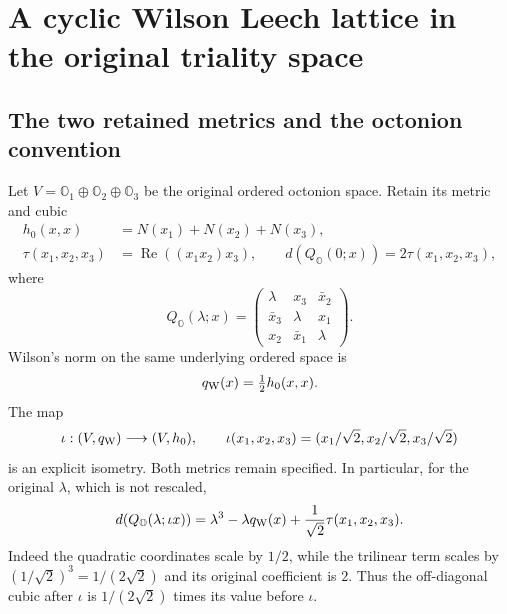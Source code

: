 \section{A cyclic Wilson Leech lattice in the original triality space}
\label{wcl:sec:construction}

\subsection{The two retained metrics and the octonion convention}

Let $V=\mathbb O_1\oplus\mathbb O_2\oplus\mathbb O_3$ be the original
ordered octonion space. Retain its metric and cubic
\[
\begin{aligned}
 h_0(x,x)&=N(x_1)+N(x_2)+N(x_3),\\
 \tau(x_1,x_2,x_3)&=\operatorname{Re}((x_1x_2)x_3),\qquad
 d(Q_{\mathbb O}(0;x))=2\tau(x_1,x_2,x_3),
\end{aligned}
\]
where
\[
 Q_{\mathbb O}(\lambda;x)=
 \begin{pmatrix}\lambda&x_3&\bar x_2\\
 \bar x_3&\lambda&x_1\\x_2&\bar x_1&\lambda\end{pmatrix}.
\]
Wilson's norm on the same underlying ordered space is
\[
 q_{\rm W}(x)=\tfrac12 h_0(x,x).
\]
The map
\begin{equation}
 \iota:(V,q_{\rm W})\longrightarrow(V,h_0),\qquad
 \iota(x_1,x_2,x_3)=(x_1/\sqrt2,x_2/\sqrt2,x_3/\sqrt2)
 \label{wcl:eq:metric-isometry}
\end{equation}
is an explicit isometry. Both metrics remain specified. In particular,
for the original $\lambda$, which is not rescaled,
\begin{equation}
 d(Q_{\mathbb O}(\lambda;\iota x))
 =\lambda^3-\lambda q_{\rm W}(x)+\frac1{\sqrt2}\tau(x_1,x_2,x_3).
 \label{wcl:eq:cubic-scaling}
\end{equation}
Indeed the quadratic coordinates scale by $1/2$, while the trilinear
term scales by $(1/\sqrt2)^3=1/(2\sqrt2)$ and its original coefficient
is $2$. Thus the off-diagonal cubic after $\iota$ is
$1/(2\sqrt2)$ times its value before $\iota$.

